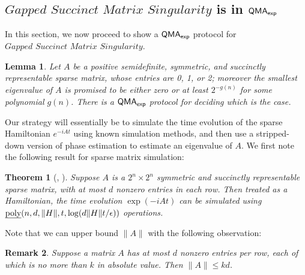 \documentclass[11pt]{article}
\newtheorem{theorem}{Theorem}
\newtheorem{lemma}{Lemma}
\newtheorem{remark}[theorem]{Remark}
\theoremstyle{definition}
\theoremstyle{remark}
\newcommand\QMAexp{{\sf{QMA}_{exp}}}
\newcommand\gappedsucc{\textit{Gapped Succinct Matrix Singularity}}
\begin{document}
\subsection{$\gappedsucc$ is in $\QMAexp$}
In this section, we now proceed to show a $\QMAexp$ protocol for $\gappedsucc$.
\begin{lemma}
Let $A$ be a positive semidefinite, symmetric, and succinctly representable sparse matrix, whose entries are 0, 1, or 2; moreover the smallest eigenvalue of $A$ is promised to be either zero or at least $2^{-g(n)}$ for some polynomial $g(n)$. There is a $\QMAexp$ protocol for deciding which is the case.
\end{lemma}
Our strategy will essentially be to simulate the time evolution of the sparse Hamiltonian $e^{-iAt}$ using known simulation methods, and then use a stripped-down version of phase estimation to estimate an eigenvalue of $A$. We first note the following result for sparse matrix simulation:
\begin{theorem}[\cite{berry14}, \cite{berry15}] \label{thm:ham_sim}
Suppose $A$ is a $2^n \times 2^n$ symmetric and succinctly representable sparse matrix, with at most $d$ nonzero entries in each row. Then treated as a Hamiltonian, the time evolution $\exp(-iAt)$ can be simulated using $\text{\emph{poly}}(n,d,\|H\|, t, \log(d\|H\|t/\epsilon))$ operations.
\end{theorem}
Note that we can upper bound $\|A\|$ with the following observation:
\begin{remark}
Suppose a matrix $A$ has at most $d$ nonzero entries per row, each of which is no more than $k$ in absolute value. Then $\| A \| \le kd$.
\end{remark}
\end{document}
